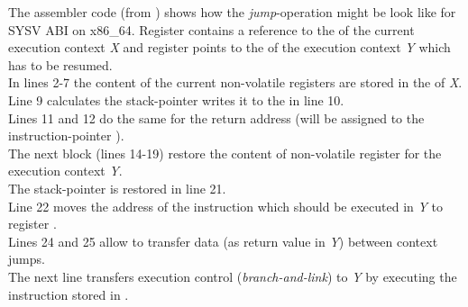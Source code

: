 \label{appendix}

The assembler code (from \boostcontext) shows how the \textit{jump}-operation
might be look like for SYSV ABI on x86\_64.
Register  contains a reference to the \cblock of the current execution
context \textit{X} and register  points to the \cblock of the execution
context \textit{Y} which has to be resumed.\\
\newline
In lines 2-7 the content of the current non-volatile registers are stored in the
\cblock of \textit{X}.\\
Line 9 calculates the stack-pointer writes it to the \cblock in line 10.\\
Lines 11 and 12 do the same for the return address (will be assigned to the
instruction-pointer ).\\
\newline
The next block (lines 14-19) restore the content of non-volatile register for
the execution context \textit{Y}.\\
The stack-pointer is restored in line 21.\\
Line 22 moves the address of the instruction which should be executed in
\textit{Y} to register .\\
\newline
Lines 24 and 25 allow to transfer data (as return value in \textit{Y}) between
context jumps.\\
\newline
The next line transfers execution control (\textit{branch-and-link}) to
\textit{Y} by executing the instruction stored in .
